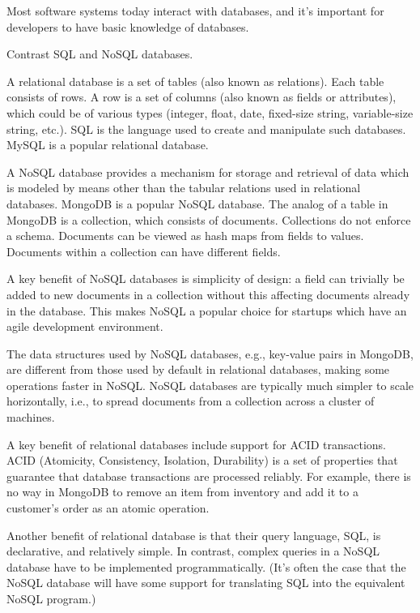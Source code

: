 \documentclass[10pt,openany,twoside,letterpaper,extrafontsizes]{memoir}
\begin{document}
\begin{Spacing}{\commonToolsSpacing}

Most software systems today interact with databases, and it's important
for developers to have basic knowledge of databases.

\label{nosql}


%
Contrast SQL and NoSQL databases.


\label{solution-nosql}
A relational database is a set of tables (also known as relations).
Each table consists of rows.
A row is a set of columns (also known as fields or attributes), which
could be of various types (integer, float, date, fixed-size string, variable-size string, etc.).
SQL is the language used to create and manipulate such databases.
MySQL is a popular relational database.

A NoSQL database provides a mechanism for storage and retrieval of
data which is modeled by means other than
the tabular relations used in relational databases.
MongoDB is a popular NoSQL database.
The analog of a table in MongoDB is a collection, which consists of documents.
Collections do not enforce a schema. Documents can be viewed as
hash maps from fields to values. Documents within a collection can have different fields.

A key benefit of NoSQL databases is simplicity of design: a field
can trivially be added to new documents in a collection without this affecting
documents already in the database. This makes NoSQL a popular choice
for startups which have an agile development environment.

The data structures used by NoSQL databases,
e.g., key-value pairs in MongoDB,
are different from those used by default in relational databases, making
some operations faster in NoSQL.
NoSQL databases are typically much simpler to scale
horizontally, i.e., to spread documents from a collection across a cluster of machines.

A key benefit of relational databases include support for ACID transactions. ACID
(Atomicity, Consistency, Isolation, Durability) is a
set of properties that guarantee that database transactions are processed reliably.
For example, there is no way in MongoDB to remove an
item from inventory and add it to a customer's order as an atomic operation.

Another benefit of relational database is that their query language, SQL, is
declarative, and relatively simple. In contrast, complex queries
in a NoSQL database have to be implemented programmatically. (It's often
the case that the NoSQL database will have some support for translating
SQL into the equivalent NoSQL program.)
\ansend


\end{Spacing}
\end{document}
